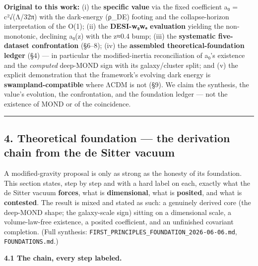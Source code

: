 \documentclass[
]{article}
\begin{document}
\textbf{Original to this work:} (i) the \textbf{specific value} via the
fixed coefficient a₀ = c²√(Λ/32π) with the dark-energy (ρ\_DE) footing
and the collapse-horizon interpretation of the O(1); (ii) the
\textbf{DESI-w₀wₐ evaluation} yielding the non-monotonic, declining
a₀(z) with the z≈0.4 bump; (iii) the \textbf{systematic five-dataset
confrontation} (§6--8); (iv) the \textbf{assembled
theoretical-foundation ledger} (§4) --- in particular the
modified-inertia reconciliation of a₀'s existence and the
\emph{computed} deep-MOND sign with its galaxy/cluster split; and (v)
the explicit demonstration that the framework's evolving dark energy is
\textbf{swampland-compatible} where ΛCDM is not (§9). We claim the
synthesis, the value's evolution, the confrontation, and the foundation
ledger --- not the existence of MOND or of the coincidence.

\begin{center}\rule{0.5\linewidth}{0.5pt}\end{center}

\subsection{4. Theoretical foundation --- the derivation chain from the
de Sitter
vacuum}\label{theoretical-foundation-the-derivation-chain-from-the-de-sitter-vacuum}

A modified-gravity proposal is only as strong as the honesty of its
foundation. This section states, step by step and with a hard label on
each, exactly what the de Sitter vacuum \textbf{forces}, what is
\textbf{dimensional}, what is \textbf{posited}, and what is
\textbf{contested}. The result is mixed and stated as such: a genuinely
derived core (the deep-MOND shape; the galaxy-scale sign) sitting on a
dimensional scale, a volume-law-free existence, a posited coefficient,
and an unfinished covariant completion. (Full synthesis:
\texttt{FIRST\_PRINCIPLES\_FOUNDATION\_2026-06-06.md},
\texttt{FOUNDATIONS.md}.)

\textbf{4.1 The chain, every step labeled.}
\end{document}
